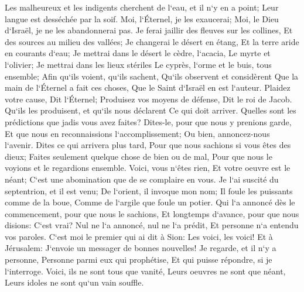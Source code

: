 \verse Les malheureux et les indigents cherchent de l`eau, et il n`y en a point; Leur langue est desséchée par la soif. Moi, l`Éternel, je les exaucerai; Moi, le Dieu d`Israël, je ne les abandonnerai pas. 
\verse Je ferai jaillir des fleuves sur les collines, Et des sources au milieu des vallées; Je changerai le désert en étang, Et la terre aride en courants d`eau; 
\verse Je mettrai dans le désert le cèdre, l`acacia, Le myrte et l`olivier; Je mettrai dans les lieux stériles Le cyprès, l`orme et le buis, tous ensemble; 
\verse Afin qu`ils voient, qu`ils sachent, Qu`ils observent et considèrent Que la main de l`Éternel a fait ces choses, Que le Saint d`Israël en est l`auteur. 
\verse Plaidez votre cause, Dit l`Éternel; Produisez vos moyens de défense, Dit le roi de Jacob. 
\verse Qu`ils les produisent, et qu`ils nous déclarent Ce qui doit arriver. Quelles sont les prédictions que jadis vous avez faites? Dites-le, pour que nous y prenions garde, Et que nous en reconnaissions l`accomplissement; Ou bien, annoncez-nous l`avenir. 
\verse Dites ce qui arrivera plus tard, Pour que nous sachions si vous êtes des dieux; Faites seulement quelque chose de bien ou de mal, Pour que nous le voyions et le regardions ensemble. 
\verse Voici, vous n`êtes rien, Et votre oeuvre est le néant; C`est une abomination que de se complaire en vous. 
\verse Je l`ai suscité du septentrion, et il est venu; De l`orient, il invoque mon nom; Il foule les puissants comme de la boue, Comme de l`argile que foule un potier. 
\verse Qui l`a annoncé dès le commencement, pour que nous le sachions, Et longtemps d`avance, pour que nous disions: C`est vrai? Nul ne l`a annoncé, nul ne l`a prédit, Et personne n`a entendu vos paroles. 
\verse C`est moi le premier qui ai dit à Sion: Les voici, les voici! Et à Jérusalem: J`envoie un messager de bonnes nouvelles! 
\verse Je regarde, et il n`y a personne, Personne parmi eux qui prophétise, Et qui puisse répondre, si je l`interroge. 
\verse Voici, ils ne sont tous que vanité, Leurs oeuvres ne sont que néant, Leurs idoles ne sont qu`un vain souffle. 

